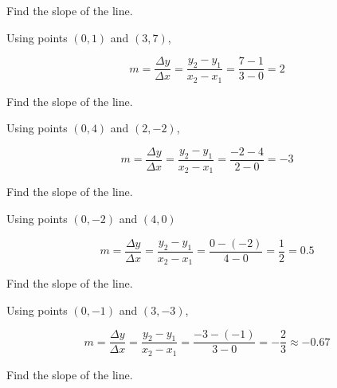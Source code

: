 \documentclass[]{exam}
\begin{document}
\begin{questions}


\question Find the slope of the line.



\begin{solution}
Using points $(0,1)$ and $(3,7)$,

\begin{equation*}
    m = \frac{\Delta y}{\Delta x} = \frac{y_2 - y_1}{x_2 - x_1} = \frac{7-1}{3-0} = \boxed{2}
\end{equation*}
\end{solution}

\question Find the slope of the line.



\begin{solution}
Using points $(0,4)$ and $(2,-2)$,

\begin{equation*}
    m = \frac{\Delta y}{\Delta x} = \frac{y_2 - y_1}{x_2 - x_1} = \frac{-2-4}{2-0} = \boxed{-3}
\end{equation*}
\end{solution}

\question Find the slope of the line.


\begin{solution}
Using points $(0,-2)$ and $(4,0)$

\begin{equation*}
    m = \frac{\Delta y}{\Delta x} = \frac{y_2 - y_1}{x_2 - x_1} = \frac{0-(-2)}{4-0} = \boxed{\frac{1}{2}} = 0.5
\end{equation*}
\end{solution}

\clearpage

\question Find the slope of the line.



\begin{solution}
Using points $(0,-1)$ and $(3,-3)$,

\begin{equation*}
    m = \frac{\Delta y}{\Delta x} = \frac{y_2 - y_1}{x_2 - x_1} = \frac{-3-(-1)}{3-0} = \boxed{-\frac{2}{3}} \approx -0.67
\end{equation*}
\end{solution}

\question Find the slope of the line.


\end{questions}
\end{document}
